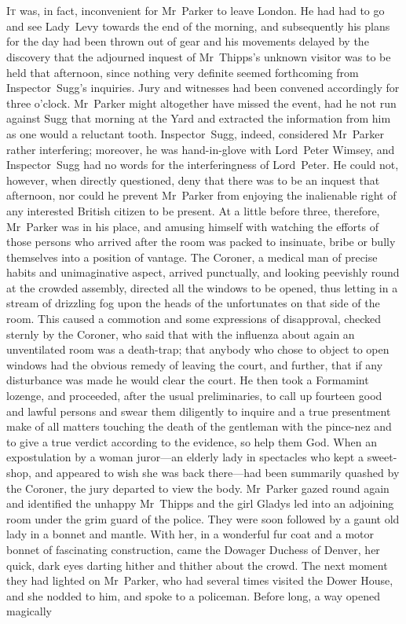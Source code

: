 \chapter[Chapter \thechapter]{}
\lettrine[lines=4]{I}{t} was, in fact, inconvenient for Mr~Parker to leave London. He had had to go and see Lady~Levy towards the end of the morning, and subsequently his plans for the day had been thrown out of gear and his movements delayed by the discovery that the adjourned inquest of Mr~Thipps's unknown visitor was to be held that afternoon, since nothing very definite seemed forthcoming from Inspector~Sugg's inquiries. Jury and witnesses had been convened accordingly for three o'clock. Mr~Parker might altogether have missed the event, had he not run against Sugg that morning at the Yard and extracted the information from him as one would a reluctant tooth. Inspector~Sugg, indeed, considered Mr~Parker rather interfering; moreover, he was hand-in-glove with Lord~Peter Wimsey, and Inspector~Sugg had no words for the interferingness of Lord~Peter. He could not, however, when directly questioned, deny that there was to be an inquest that afternoon, nor could he prevent Mr~Parker from enjoying the inalienable right of any interested British citizen to be present. At a little before three, therefore, Mr~Parker was in his place, and amusing himself with watching the efforts of those persons who arrived after the room was packed to insinuate, bribe or bully themselves into a position of vantage. The Coroner, a medical man of precise habits and unimaginative aspect, arrived punctually, and looking peevishly round at the crowded assembly, directed all the windows to be opened, thus letting in a stream of drizzling fog upon the heads of the unfortunates on that side of the room. This caused a commotion and some expressions of disapproval, checked sternly by the Coroner, who said that with the influenza about again an unventilated room was a death-trap; that anybody who chose to object to open windows had the obvious remedy of leaving the court, and further, that if any disturbance was made he would clear the court. He then took a Formamint lozenge, and proceeded, after the usual preliminaries, to call up fourteen good and lawful persons and swear them diligently to inquire and a true presentment make of all matters touching the death of the gentleman with the pince-nez and to give a true verdict according to the evidence, so help them God. When an expostulation by a woman juror—an elderly lady in spectacles who kept a sweet-shop, and appeared to wish she was back there—had been summarily quashed by the Coroner, the jury departed to view the body. Mr~Parker gazed round again and identified the unhappy Mr~Thipps and the girl Gladys led into an adjoining room under the grim guard of the police. They were soon followed by a gaunt old lady in a bonnet and mantle. With her, in a wonderful fur coat and a motor bonnet of fascinating construction, came the Dowager Duchess of Denver, her quick, dark eyes darting hither and thither about the crowd. The next moment they had lighted on Mr~Parker, who had several times visited the Dower House, and she nodded to him, and spoke to a policeman. Before long, a way opened magically 